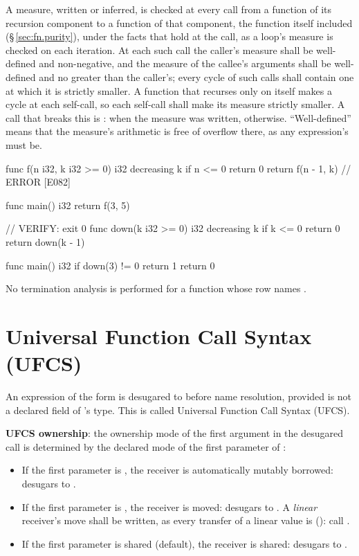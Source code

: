 \pnum
A measure, written or inferred, is checked at every call from a function of its recursion
component to a function of that component, the function itself included
(\S\,\ref{sec:fn.purity}), under the facts that hold at the call, as a loop's measure is checked
on each iteration.  At each such call the caller's measure shall be well-defined and
non-negative, and the measure of the callee's arguments shall be well-defined and no greater
than the caller's; every cycle of such calls shall contain one at which it is strictly smaller.
A function that recurses only on itself makes a cycle at each self-call, so each self-call shall
make its measure strictly smaller.  A call that breaks this is \illformed{}: 
when the measure was written,  otherwise.  ``Well-defined'' means that the
measure's arithmetic is free of overflow there, as any expression's must be.

\begin{laincode}
func f(n i32, k i32 >= 0) i32 decreasing k {
    if n <= 0 { return 0 }
    return f(n - 1, k)    // ERROR [E082]
}

func main() i32 {
    return f(3, 5)
}
\end{laincode}

\begin{laincode}
// VERIFY: exit 0
func down(k i32 >= 0) i32 decreasing k {
    if k <= 0 { return 0 }
    return down(k - 1)
}

func main() i32 {
    if down(3) != 0 { return 1 }
    return 0
}
\end{laincode}

\pnum
No termination analysis is performed for a function whose row names .

\section{Universal Function Call Syntax (UFCS)}
\label{sec:fn.ufcs}

\pnum
An expression of the form  is desugared to 
before name resolution, provided  is not a declared field of
's type.  This is called Universal Function Call Syntax (UFCS).

\pnum
\textbf{UFCS ownership}: the ownership mode of the first argument in the
desugared call is determined by the declared mode of the first parameter of
:

\begin{itemize}
  \item If the first parameter is , the receiver is automatically
        mutably borrowed:  desugars to .
  \item If the first parameter is , the receiver is moved:
         desugars to .  A \emph{linear} receiver's move shall
        be written, as every transfer of a linear value is (): call
        .
  \item If the first parameter is shared (default), the receiver is shared:
         desugars to .
\end{itemize}

